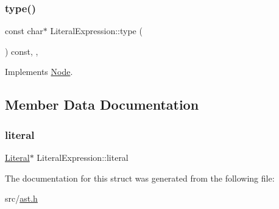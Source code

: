 \subsubsection{\texorpdfstring{type()}{type()}}
{\footnotesize\ttfamily const char$\ast$ Literal\+Expression\+::type (\begin{DoxyParamCaption}{ }\end{DoxyParamCaption}) const\hspace{0.3cm}{\ttfamily [inline]}, {\ttfamily [override]}, {\ttfamily [virtual]}}



Implements \hyperlink{struct_node_a82f29420d0a38efcc370352528e94e9b}{Node}.



\subsection{Member Data Documentation}
\mbox{\label{struct_literal_expression_a9d2347f8e6e56bd6e43f12954db93926}} 
\subsubsection{\texorpdfstring{literal}{literal}}
{\footnotesize\ttfamily \hyperlink{struct_literal}{Literal}$\ast$ Literal\+Expression\+::literal}



The documentation for this struct was generated from the following file\+:\begin{DoxyCompactItemize}
\item 
src/\hyperlink{ast_8h}{ast.\+h}\end{DoxyCompactItemize}
